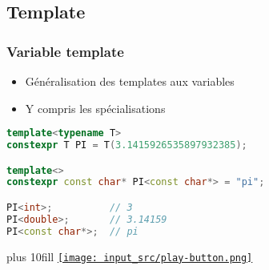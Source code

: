 \documentclass[C++.tex]{subfiles}
\begin{document}
\subsection*{Template}
\begin{frame}[fragile]
	\frametitle{Variable template}
	\begin{itemize}
		\item Généralisation des templates aux variables
		\item Y compris les spécialisations
	\end{itemize}

	\begin{lstlisting}[language=C++]
template<typename T>
constexpr T PI = T(3.1415926535897932385);

template<>
constexpr const char* PI<const char*> = "pi";

PI<int>;          // 3
PI<double>;       // 3.14159
PI<const char*>;  // pi\end{lstlisting}

	\vskip 10mm plus 10fill
	\hfill
	\href{https://godbolt.org/#g:!((g:!((g:!((h:codeEditor,i:(filename:'1',fontScale:14,fontUsePx:'0',j:1,lang:c%2B%2B,selection:(endColumn:1,endLineNumber:15,positionColumn:1,positionLineNumber:15,selectionStartColumn:1,selectionStartLineNumber:1,startColumn:1,startLineNumber:1),source:'%23include+%3Ciostream%3E%0A%0Atemplate%3Ctypename+T%3E%0Aconstexpr+T+PI+%3D+T(3.1415926535897932385)%3B%0A%0Atemplate%3C%3E%0Aconstexpr+const+char*+PI%3Cconst+char*%3E+%3D+%22pi%22%3B%0A%0Aint+main()%0A%7B%0A++std::cout+%3C%3C+PI%3Cint%3E+%3C%3C+!'%5Cn!'%3B%0A++std::cout+%3C%3C+PI%3Cdouble%3E+%3C%3C+!'%5Cn!'%3B%0A++std::cout+%3C%3C+PI%3Cconst+char*%3E+%3C%3C+!'%5Cn!'%3B%0A%7D%0A'),l:'5',n:'0',o:'C%2B%2B+source+%231',t:'0')),k:50,l:'4',n:'0',o:'',s:0,t:'0'),(g:!((h:executor,i:(argsPanelShown:'1',compilationPanelShown:'0',compiler:g122,compilerName:'',compilerOutShown:'0',execArgs:'',execStdin:'',fontScale:14,fontUsePx:'0',j:1,lang:c%2B%2B,libs:!((name:boost,ver:'175')),options:'-std%3Dc%2B%2B14+-Wall+-Wextra',source:1,stdinPanelShown:'1',tree:'1',wrap:'0'),l:'5',n:'0',o:'Executor+x86-64+gcc+12.2+(C%2B%2B,+Editor+%231)',t:'0')),header:(),k:50,l:'4',n:'0',o:'',s:0,t:'0')),l:'2',n:'0',o:'',t:'0')),version:4}{\texttt{[image: input\_src/play-button.png]}}
\end{frame}
\end{document}
